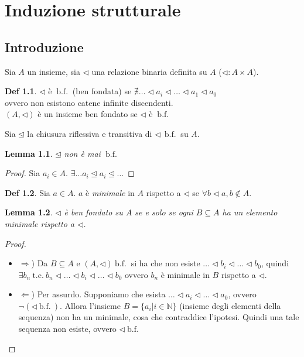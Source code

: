 \documentclass[a4paper]{report}
\newcommand{\bnfn}{\ \mathrm{b.f.}\ }
\newcommand{\sse}{se e solo se}
\newcommand{\tc}{\ \mathrm{t.c.}\ }
\theoremstyle{definition} \newtheorem*{defi}{Def}
\theoremstyle{plain} \newtheorem{lemma}{Lemma}
\theoremstyle{plain} \newtheorem{teo}{Teorema}
\theoremstyle{remark} \newtheorem*{es}{Esempio}
\begin{document}
\chapter{Induzione strutturale}
\section*{Introduzione}
Sia $A$ un insieme, sia $\lhd$ una relazione binaria definita su $A$
($\lhd : A \times A$).
\begin{defi}
  $\lhd$ è $\bnfn$ (ben fondata) se $\nexists \ldots \lhd a_i \lhd \ldots \lhd a_1 \lhd a_0$
  \\
  ovvero non esistono catene infinite discendenti.
  \\
  $(A, \lhd)$ è un insieme ben fondato se $\lhd$ è $\bnfn$
\end{defi}
Sia $\unlhd$ la chiusura riflessiva e transitiva di $\lhd \ \bnfn$ su $A$.
\begin{lemma}
  $\unlhd$ non è mai $\bnfn$
\end{lemma}
\begin{proof}
  Sia $a_i \in A$. $\exists \ldots a_i \unlhd a_i \unlhd \ldots$ \qedhere
\end{proof}
\begin{defi}
  Sia $a \in A$. $a$ è \emph{minimale} in $A$ rispetto a $\lhd$ se
  $\forall b \lhd a, b \not\in A$.
\end{defi}
\begin{lemma}
  \label{lemma:2}
  $\lhd$ è ben fondato su $A$ \sse{} ogni $B \subseteq A$ ha un elemento
  minimale rispetto a $\lhd$.
\end{lemma}
\begin{proof}
  \begin{itemize}
    \item{$\Rightarrow$)} Da $ B \subseteq A$ e $(A, \lhd) \bnfn$ si ha che
      non esiste $\ldots \lhd b_i \lhd \ldots \lhd b_0$, quindi 
      $\exists b_n \tc b_n \lhd \ldots \lhd b_i \lhd \ldots \lhd b_0$
      ovvero $b_n$ è minimale in $B$ rispetto a $\lhd$.
    \item{$\Leftarrow$)} Per assurdo. Supponiamo che esista
      $\ldots \lhd a_i \lhd \ldots \lhd a_0$, ovvero $\neg (\lhd \bnfn)$.
      Allora l'insieme $B=\{a_i|i\in\mathbb{N}\}$ (insieme degli elementi
      della sequenza) non ha un minimale, cosa che contraddice l'ipotesi.
      Quindi una tale sequenza non esiste, ovvero $\lhd \bnfn$
  \end{itemize}
\end{proof}
\newpage
\end{document}
